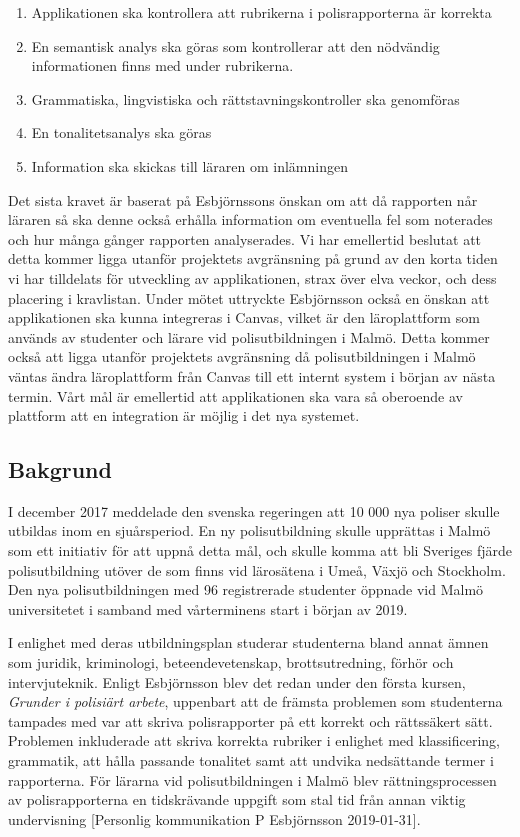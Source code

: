 \documentclass[swedish]{maucsthesis}
\begin{document}
\begin{enumerate}
\item Applikationen ska kontrollera att rubrikerna i polisrapporterna är korrekta
\item En semantisk analys ska göras som kontrollerar att den nödvändig
  informationen finns med under rubrikerna.
\item Grammatiska, lingvistiska och rättstavningskontroller ska genomföras
\item En tonalitetsanalys ska göras
\item Information ska skickas till läraren om inlämningen    
\end{enumerate}
Det sista kravet är baserat på Esbjörnssons önskan om att då rapporten når
läraren så ska denne också erhålla information om eventuella fel som noterades
och hur många gånger rapporten analyserades. Vi har emellertid beslutat att
detta kommer ligga utanför projektets avgränsning på grund av den korta tiden vi
har tilldelats för utveckling av applikationen, strax över elva veckor, och
dess placering i kravlistan. Under mötet uttryckte Esbjörnsson också en
önskan att applikationen ska kunna integreras i Canvas, vilket är den
läroplattform som används av studenter och lärare vid polisutbildningen i Malmö. Detta kommer också att ligga utanför projektets avgränsning då
polisutbildningen i Malmö väntas ändra läroplattform från Canvas till ett internt
system i början av nästa termin. Vårt mål är emellertid att applikationen ska
vara så oberoende av plattform att en integration är möjlig i det nya systemet.

\subsection{Bakgrund}
I december 2017 meddelade den svenska regeringen att 10 000 nya poliser skulle
utbildas inom en sjuårsperiod. En ny polisutbildning skulle upprättas i Malmö
som ett initiativ för att uppnå detta mål, och skulle komma att bli Sveriges
fjärde polisutbildning utöver de som finns vid lärosätena i Umeå, Växjö och
Stockholm. Den nya polisutbildningen med 96 registrerade studenter öppnade vid
Malmö universitetet i samband med vårterminens start i början av 2019.

I enlighet med deras utbildningsplan studerar studenterna bland annat ämnen som
juridik, kriminologi, beteendevetenskap, brottsutredning, förhör och
intervjuteknik. Enligt Esbjörnsson blev det
redan under den första kursen, \textit {Grunder i polisiärt arbete}, uppenbart att de
främsta problemen som studenterna tampades med var att skriva polisrapporter på
ett korrekt och rättssäkert sätt. Problemen inkluderade att skriva korrekta
rubriker i enlighet med klassificering, grammatik, att hålla passande
tonalitet samt att undvika nedsättande termer i rapporterna. För lärarna vid
polisutbildningen i Malmö blev rättningsprocessen av polisrapporterna en
tidskrävande uppgift som stal tid från annan viktig undervisning [Personlig kommunikation P Esbjörnsson 2019-01-31].
\end{document}
